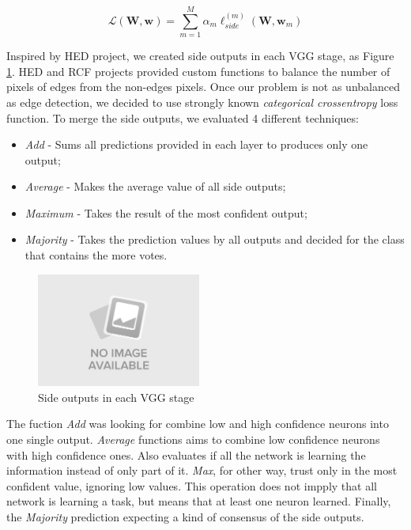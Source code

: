 \begin{equation}
\mathcal{L}(\mathbf{W},\mathbf{w})=\sum_{m=1}^M\alpha_m\ell_{side}^{(m)}(\mathbf{W},\mathbf{w}_m)
\end{equation}

Inspired by HED project, we created side outputs in each VGG stage, as Figure \ref{fig:stage_outputs}. HED and RCF projects provided custom functions to balance the number of pixels of edges from the non-edges pixels. Once our problem is not as unbalanced as edge detection, we decided to use strongly known \textit{{categorical} {crossentropy}} loss function. To merge the side outputs, we evaluated 4 different techniques:

\begin{itemize}
 \item \textit{Add} - Sums all predictions provided in each layer to produces only one output;
 
 \item \textit{Average} - Makes the average value of all side outputs;
 
 \item \textit{Maximum} - Takes the result of the most confident output;
 
 \item \textit{Majority} - Takes the prediction values by all outputs and decided for the class that contains the more votes.
\end{itemize}

\begin{figure}
  \centering
  \includegraphics[width=0.48\textwidth]{figures/no_image.jpeg}
  \caption{Side outputs in each VGG stage}
  \label{fig:stage_outputs}
\end{figure}

The fuction \textit{Add} was looking for combine low and high confidence neurons into one single output. \textit{Average} functions aims to combine low confidence neurons with high confidence ones. Also evaluates if all the network is learning the information instead of only part of it. \textit{Max}, for other way, trust only in the most confident value, ignoring low values. This operation does not impply that all network is learning a task, but means that at least one neuron learned. Finally, the \textit{Majority} prediction expecting a kind of consensus of the side outputs.

